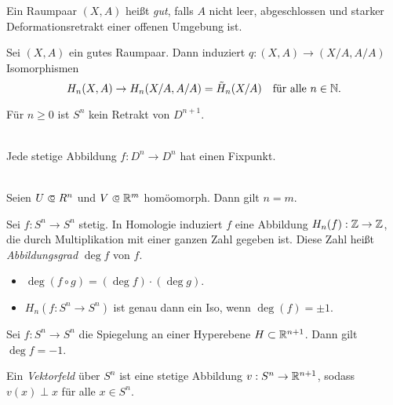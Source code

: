 \documentclass{cheat-sheet}
\newcommand{\RH}{\tilde{H}} %
\begin{document}
\begin{defn}
  Ein Raumpaar $(X, A)$ heißt \emph{gut}, falls $A$ nicht leer, abgeschlossen und starker Deformationsretrakt einer offenen Umgebung ist.
\end{defn}

\begin{prop}
  Sei $(X, A)$ ein gutes Raumpaar. Dann induziert $q : (X, A) \to (X/A, A/A)$ Isomorphismen
  \[ H_n(X, A) \to H_n(X/A, A/A) = \RH_n(X/A) \quad \text{für alle $n \in \N$.} \]
\end{prop}

\begin{satz}
  Für $n \geq 0$ ist $S^n$ kein Retrakt von $D^{n+1}$.
\end{satz}

\begin{kor}\mbox{}\\
  Jede stetige Abbildung $f : D^n \to D^n$ hat einen Fixpunkt.
\end{kor}

\begin{satz}\mbox{}\\
  Seien $U \opn R^n$ und $V \opn \R^m$ homöomorph. Dann gilt $n = m$.
\end{satz}


\begin{defn}
  Sei $f : S^n \to S^n$ stetig. In Homologie induziert $f$ eine Abbildung $H_n(f) : \mathbb{Z} \to \mathbb{Z}$, die durch Multiplikation mit einer ganzen Zahl gegeben ist. Diese Zahl heißt \emph{Abbildungsgrad} $\deg f$ von $f$.
\end{defn}

\begin{beob}
  \begin{itemize}
    \item $\deg (f \circ g) = (\deg f) \cdot (\deg g)$.
    \item $H_n(f : S^n \to S^n)$ ist genau dann ein Iso, wenn $\deg(f) = \pm 1$.
  \end{itemize}
\end{beob}

\begin{prop}
  Sei $f : S^n \to S^n$ die Spiegelung an einer Hyperebene $H \subset \mathbb{R}^{n+1}$. Dann gilt $\deg f = -1$.
\end{prop}

\begin{defn}
  Ein \emph{Vektorfeld} über $S^n$ ist eine stetige Abbildung $v : S^n \to \mathbb{R}^{n+1}$, sodass $v(x) \perp x$ für alle $x \in S^n$.
\end{defn}
\end{document}
